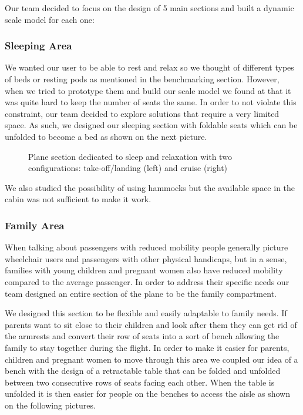 Our team decided to focus on the design of 5 main sections and built a dynamic scale model for each one:

\subsubsection{Sleeping Area}
We wanted our user to be able to rest and relax so we thought of different types of beds or resting pods as mentioned in the benchmarking section. However, when we tried to prototype them and build our scale model we found at that it was quite hard to keep the number of seats the same. In order to not violate this constraint, our team decided to explore solutions that require a very limited space. As such, we designed our sleeping section with foldable seats which can be unfolded to become a bed as shown on the next picture.

\begin{figure}[h]
  \centering
   \caption{Plane section dedicated to sleep and relaxation with two configurations: take-off/landing (left) and cruise (right)}
  \label{fig:PHOTO ROBBIE}
\end{figure}

We also studied the possibility of using hammocks but the available space in the cabin was not sufficient to make it work.

\subsubsection{Family Area}
When talking about passengers with reduced mobility people generally picture wheelchair users and passengers with other physical handicaps, but in a sense, families with young children and pregnant women also have reduced mobility compared to the average passenger. In order to address their specific needs our team designed an entire section of the plane to be the family compartment.

We designed this section to be flexible and easily adaptable to family needs. If parents want to sit close to their children and look after them they can get rid of the armrests and convert their row of seats into a sort of bench allowing the family to stay together during the flight. In order to make it easier for parents, children and pregnant women to move through this area we coupled our idea of a bench with the design of a retractable table that can be folded and unfolded between two consecutive rows of seats facing each other. When the table is unfolded it is then easier for people on the benches to access the aisle as shown on the following pictures. 


